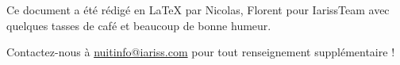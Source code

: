 \documentclass[12pt, a4paper]{article}
\newcommand{\espace}{\vspace{.8cm}}
\newcommand{\authors}{Nicolas, Florent}
\begin{document}

\espace\vfill{}
Ce document a été rédigé en \LaTeX{} par \authors{} pour IarissTeam avec quelques tasses de café et beaucoup de bonne humeur.

Contactez-nous à \href{mailto:nuitinfo@iariss.com}{nuitinfo@iariss.com} pour tout renseignement supplémentaire !
\end{document}
